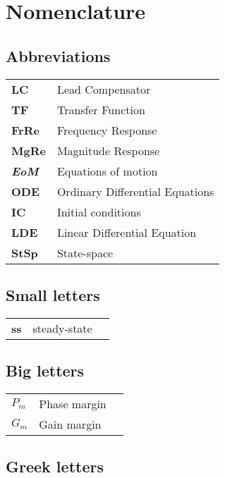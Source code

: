 

\chapter*{Nomenclature}
\section*{Abbreviations}
\begin{table}[H]
	\renewcommand{\arraystretch}{1.1}
\begin{tabular}{ll}
	\textbf{LC} & Lead Compensator \\
	\textbf{TF} & Transfer Function \\
	\textbf{FrRe} & Frequency Response \\
	\textbf{MgRe} & Magnitude Response \\
	\textbf{\textit{EoM}} & Equations of motion \\
	\textbf{ODE} & Ordinary Differential Equations \\
	\textbf{IC} & Initial conditions \\
	\textbf{LDE} & Linear Differential Equation \\
	\textbf{StSp} & State-space \\
\end{tabular}
\end{table}

\section*{Small letters}
\begin{table}[H]
	\renewcommand{\arraystretch}{1.1}
\begin{tabular}{lll}
 	\textbf{ss} & steady-state \\
\end{tabular}
\end{table}

\section*{Big letters}
\begin{table}[H]
	
\begin{tabular}{lll}
	$P_{m}$ & Phase margin \\
	$G_{m}$ & Gain margin \\
\end{tabular}
\end{table}

\section*{Greek letters}
\begin{table}[H]
	\renewcommand{\arraystretch}{1.1}
\begin{tabular}{lll}

\end{tabular}
\end{table}